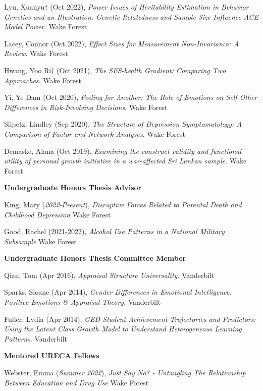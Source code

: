 \begin{etaremune}%
\item  Lyu, Xuanyu$\dagger$ (Oct 2022), \textit{Power Issues of Heritability Estimation in Behavior Genetics and an Illustration: Genetic Relatedness and Sample Size Influence ACE Model Power.}  Wake Forest%
\item Lacey, Connor (Oct 2022), \textit{Effect Sizes for Measurement Non-Invariance: A Review}.  Wake Forest%
\item Hwang, Yoo Ri$\dagger$ (Oct 2021), \textit{The SES-health Gradient: Comparing Two Approaches}. Wake Forest%
\item Yi, Ye Dam (Oct 2020), \textit{Feeling for Another: The Role of Emotions on Self-Other Differences in Risk-Involving Decisions}. Wake Forest%
\item Slipetz, Lindley (Sep 2020), \textit{The Structure of Depression Symptomatology: A Comparison of Factor and Network Analyses}. Wake Forest%
\item Demaske, Alana (Oct 2019), \textit{Examining the construct validity and functional utility of personal growth initiative in a war-affected Sri Lankan sample}. Wake Forest%
\end{etaremune}%
%
{\large\textbf{Undergraduate Honors Thesis Advisor}}
\begin{etaremune}%
\item King, Mary (\textit{2022-Present}), \textit{Disruptive Forces Related to Parental Death and Childhood Depression} Wake Forest%
\item Good, Rachel (2021-2022), \textit{Alcohol Use Patterns in a National Military Subsample} Wake Forest%
\end{etaremune}%


{\large\textbf{Undergraduate Honors Thesis Committee Member}}
\begin{etaremune}
\item Qian, Tom (Apr 2016), \textit{Appraisal Structure Universality}. Vanderbilt%
%
\item Sparks, Sloane (Apr 2014), \textit{Gender Differences in Emotional Intelligence: Positive Emotions \& Appraisal Theory}. Vanderbilt%
\item Fuller, Lydia (Apr 2014), \textit{GED Student Achievement Trajectories and Predictors: Using the Latent Class Growth Model to Understand Heterogeneous Learning Patterns}. Vanderbilt%
\end{etaremune}


{\large\textbf{Mentored URECA Fellows}}
\begin{etaremune}%
\item Webster, Emma (\textit{Summer 2022}), \textit{Just Say No? - Untangling The Relationship Between Education and Drug Use} Wake Forest%
\end{etaremune}%
